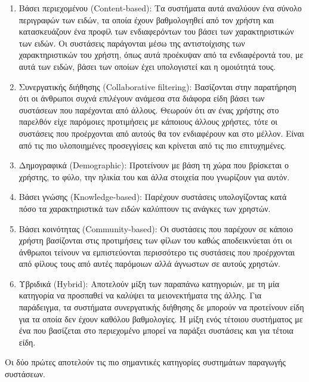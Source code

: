 \begin{enumerate}
\item Βάσει περιεχομένου ({\en Content-based}): Τα συστήματα αυτά αναλύουν ένα σύνολο περιγραφών των ειδών, τα οποία έχουν βαθμολογηθεί από τον χρήστη και κατασκευάζουν ένα προφίλ των ενδιαφερόντων του βάσει των χαρακτηριστικών των ειδών. \cite{Mladenic:1999:TRI:630307.630472}  Οι συστάσεις παράγονται μέσω της αντιστοίχισης των χαρακτηριστικών του χρήστη, όπως αυτά προέκυψαν από τα ενδιαφέροντά του, με αυτά των ειδών, βάσει των οποίων έχει υπολογιστεί και η ομοιότητά τους. 
\item Συνεργατικής διήθησης ({\en Collaborative filtering}): Bασίζονται στην παρατήρηση ότι οι άνθρωποι συχνά επιλέγουν ανάμεσα στα διάφορα είδη βάσει των συστάσεων που παρέχονται από άλλους.  Θεωρούν ότι αν ένας χρήστης στο παρελθόν είχε παρόμοιες προτιμήσεις με κάποιους άλλους χρήστες, τότε οι συστάσεις που προέρχονται από αυτούς θα τον ενδιαφέρουν και στο μέλλον. Είναι από τις πιο υλοποιημένες προσεγγίσεις \cite{ricci2011recommender} και κρίνεται από τις πιο επιτυχημένες.\cite{Nikolakopoulos2015126}
\item Δημογραφικά ({\en Demographic}): Προτείνουν με βάση τη χώρα που βρίσκεται ο χρήστης, το φύλο, την ηλικία του και άλλα στοιχεία που γνωρίζουν για αυτόν.
\item Βάσει γνώσης ({\en Knowledge-based}): Παρέχουν συστάσεις υπολογίζοντας κατά πόσο τα χαρακτηριστικά των ειδών καλύπτουν τις ανάγκες των χρηστών.
\item Βάσει κοινότητας ({\en Community-based}): Οι συστάσεις που παρέχουν σε κάποι\-ο χρήστη βασίζονται στις προτιμήσεις των φίλων του καθώς αποδεικνύεται ότι οι άνθρωποι τείνουν να εμπιστεύονται περισσότερο τις συστάσεις που προέρχονται από φίλους τους από αυτές παρόμοιων αλλά άγνωστων σε αυτούς χρηστών. \cite{conf/delos/SinhaS01}
\item Υβριδικά ({\en Hybrid}): Αποτελούν μίξη των παραπάνω κατηγοριών, με τη μία κατηγορία να προσπαθεί να καλύψει τα μειονεκτήματα της άλλης. Για παράδειγμα, τα συστήματα συνεργατικής διήθησης δε μπορούν να προτείνουν είδη για τα οποία δεν έχουν καθόλου βαθμολογίες. Η μίξη ενός τέτοιου συστήματος με ένα που βασίζεται στο περιεχομένο μπορεί να παράξει συστάσεις και για τέτοια είδη. 
\end{enumerate}
Οι δύο πρώτες αποτελούν τις πιο σημαντικές κατηγορίες συστημάτων παραγωγής συστάσεων.  
